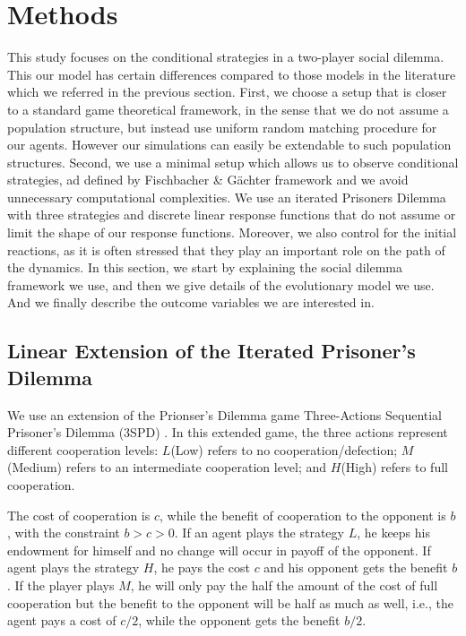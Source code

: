 \documentclass[12pt]{article}
\begin{document}
\section{Methods}

This study focuses on the conditional strategies in a two-player social dilemma. This our model has certain differences compared to those models in the literature which we referred in the previous section. First, we choose a setup that is closer to a standard game theoretical framework, in the sense that we do not assume a population structure, but instead use uniform random matching procedure for our agents. However our simulations can easily be extendable to such population structures. Second, we use a minimal setup which allows us to observe conditional strategies, ad defined by Fischbacher \& G{\"a}chter framework and we avoid unnecessary computational complexities. We use an iterated Prisoners Dilemma with three strategies and discrete linear response functions that do not assume or limit the shape of our response functions. Moreover, we also control for the initial reactions, as it is often stressed that they play an important role on the path of the dynamics. In this section, we start by explaining the social dilemma framework we use, and then we give details of the evolutionary model we use. And we finally describe the outcome variables we are interested in. 

\subsection{Linear Extension of the Iterated Prisoner's Dilemma} 
 We use an extension of the Prionser's Dilemma game Three-Actions Sequential Prisoner’s Dilemma (3SPD) \citep{andreozzi2020stability}. In this extended game, the three actions represent different cooperation levels: $L$(Low) refers to no cooperation/defection; $M$(Medium) refers to an intermediate cooperation level; and $H$(High) refers to full cooperation.  

The cost of cooperation is $c$, while the benefit of cooperation to the opponent is $b$, with the constraint $b>c>0$. If an agent plays the strategy $L$, he keeps his endowment for himself and no change will occur in payoff of the opponent. If agent plays the strategy $H$, he pays the cost $c$ and his opponent gets the benefit $b$. If the player plays $M$, he will only pay the half the amount of the cost of full cooperation but the benefit to the opponent will be half as much as well, i.e., the agent pays a cost of $c/2$, while the opponent gets the benefit $b/2$. 
\end{document}

